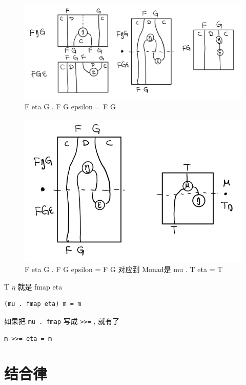 \documentclass[letterspacing]{tufte-book}
\begin{document}
\begin{figure}[htbp]
\centering
\includegraphics[width=.9\linewidth]{images/p1-adjunction-functor-triangle-reverse.png}
\caption{F eta G . F G epsilon = F G}
\end{figure}
\begin{figure}[htbp]
\centering
\includegraphics[width=.9\linewidth]{images/p1-monad-triangle-reverse.png}
\caption{F eta G . F G epsilon = F G 对应到 Monad是 mu . T eta = T}
\end{figure}
T \(\eta\) 就是 fmap eta
\lstset{language=haskell,label= ,caption= ,captionpos=b,numbers=none}
\begin{lstlisting}
(mu . fmap eta) m = m
\end{lstlisting}

如果把 \texttt{mu . fmap} 写成 \texttt{>>=} , 就有了

\lstset{language=haskell,label= ,caption= ,captionpos=b,numbers=none}
\begin{lstlisting}
m >>= eta = m
\end{lstlisting}

\section{结合律}
\label{sec:org3ad2f67}
\end{document}
